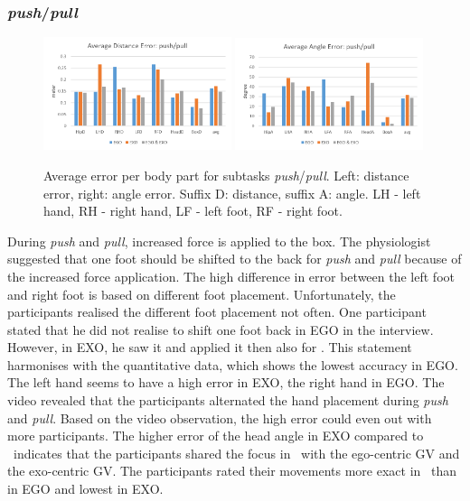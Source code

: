 \subsubsection{\textit{push}/\textit{pull}}
\begin{figure}[H]
	\centering
	\includegraphics[width=0.49\textwidth]{figures/distanceErrorPushPull.png}
	\includegraphics[width=0.49\textwidth]{figures/angleErrorPushPull.png}
	\caption[Average error per body part for subtasks \textit{push}/\textit{pull}.]{Average error per body part for subtasks \textit{push}/\textit{pull}. Left: distance error, right: angle error. Suffix D: distance, suffix A: angle. LH - left hand, RH - right hand, LF - left foot, RF - right foot.}
	\label{fig:errorPushPull}
\end{figure}
During \textit{push} and \textit{pull}, increased force is applied to the box. The physiologist suggested that one foot should be shifted to the back for \textit{push} and \textit{pull} because of the increased force application. The high difference in error between the left foot and right foot is based on different foot placement. Unfortunately, the participants realised the different foot placement not often. One participant stated that he did not realise to shift one foot back in EGO in the interview. However, in EXO, he saw it and applied it then also for \combi. This statement harmonises with the quantitative data, which shows the lowest accuracy in EGO. The left hand seems to have a high error in EXO, the right hand in EGO. The video revealed that the participants alternated the hand placement during \textit{push} and \textit{pull}. Based on the video observation, the high error could even out with more participants. The higher error of the head angle in EXO compared to \combi\ indicates that the participants shared the focus in \combi\ with the ego-centric GV and the exo-centric GV. The participants rated their movements more exact in \combi\ than in EGO and lowest in EXO.

